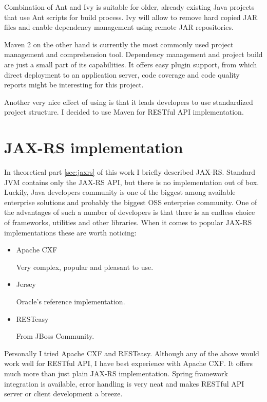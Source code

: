 	Combination of Ant and Ivy is suitable for older, already existing Java projects that use Ant scripts for build
	process. Ivy will allow to remove hard copied JAR files and enable dependency management using remote JAR repositories.
	
	Maven 2 on the other hand is currently the most commonly used project management and comprehension tool. Dependency
	management and project build are just a small part of its capabilities. It offers easy plugin support, from which
	direct deployment to an application server, code coverage and code quality reports might be interesting for this
	project.
	
	Another very nice effect of using is that it leads developers to use standardized project structure. I decided to use
	Maven for RESTful API implementation.
	
	\section{JAX-RS implementation}
	
	In theoretical part \ref{sec:jaxrs} of this work I briefly described JAX-RS. Standard JVM contains only the JAX-RS
	API, but there is no implementation out of box. Luckily, Java developers community is one of the biggest among
	available enterprise solutions and probably the biggest \gls{OSS} enterprise community.
	One of the advantages of such a number of developers is that there is an endless choice of frameworks, utilities and
	other libraries. When it comes to popular JAX-RS implementations these are worth noticing:
	
	\begin{itemize}
	  \item Apache CXF
	  
	  Very complex, popular and pleasant to use.
	  \item Jersey
	  
	  Oracle's reference implementation.
	  \item RESTeasy
	  
	  From JBoss Community.
	\end{itemize}
	
	Personally I tried Apache CXF and RESTeasy. Although any of the above would work well for RESTful API, I have best
	experience with Apache CXF. It offers much more than just plain JAX-RS implementation. Spring framework integration is
	available, error handling is very neat and makes RESTful API server or client development a breeze.
	

